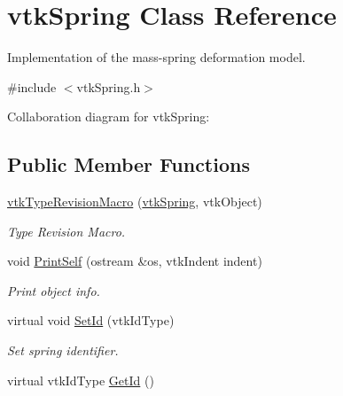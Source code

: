 \hypertarget{classvtkSpring}{
\section{vtkSpring Class Reference}
\label{classvtkSpring}
}


Implementation of the mass-\/spring deformation model.  




{\ttfamily \#include $<$vtkSpring.h$>$}



Collaboration diagram for vtkSpring:\subsection*{Public Member Functions}
\begin{DoxyCompactItemize}
\item 
\hypertarget{classvtkSpring_ac6dbbcb7c47b53c2423213ee87e375a0}{
\hyperlink{classvtkSpring_ac6dbbcb7c47b53c2423213ee87e375a0}{vtkTypeRevisionMacro} (\hyperlink{classvtkSpring}{vtkSpring}, vtkObject)}
\label{classvtkSpring_ac6dbbcb7c47b53c2423213ee87e375a0}

\begin{DoxyCompactList}\small\item\em Type Revision Macro. \item\end{DoxyCompactList}\item 
\hypertarget{classvtkSpring_a7fba731369c382c95aaf419a0bc1c827}{
void \hyperlink{classvtkSpring_a7fba731369c382c95aaf419a0bc1c827}{PrintSelf} (ostream \&os, vtkIndent indent)}
\label{classvtkSpring_a7fba731369c382c95aaf419a0bc1c827}

\begin{DoxyCompactList}\small\item\em Print object info. \item\end{DoxyCompactList}\item 
\hypertarget{classvtkSpring_aa96e6d29f86cbaa84d66609813e79882}{
virtual void \hyperlink{classvtkSpring_aa96e6d29f86cbaa84d66609813e79882}{SetId} (vtkIdType)}
\label{classvtkSpring_aa96e6d29f86cbaa84d66609813e79882}

\begin{DoxyCompactList}\small\item\em Set spring identifier. \item\end{DoxyCompactList}\item 
\hypertarget{classvtkSpring_a9d1a29d1eba1b7738022e233abd40139}{
virtual vtkIdType \hyperlink{classvtkSpring_a9d1a29d1eba1b7738022e233abd40139}{GetId} ()}
\label{classvtkSpring_a9d1a29d1eba1b7738022e233abd40139}


\end{DoxyCompactItemize}
